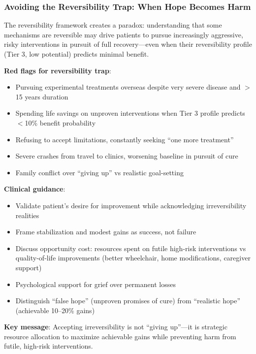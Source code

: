 \subsubsection{Avoiding the Reversibility Trap: When Hope Becomes Harm}

\begin{warning}
The reversibility framework creates a paradox: understanding that some mechanisms are reversible may drive patients to pursue increasingly aggressive, risky interventions in pursuit of full recovery---even when their reversibility profile (Tier 3, low potential) predicts minimal benefit.

\textbf{Red flags for reversibility trap}:
\begin{itemize}
    \item Pursuing experimental treatments overseas despite very severe disease and $>$15 years duration
    \item Spending life savings on unproven interventions when Tier 3 profile predicts $<$10\% benefit probability
    \item Refusing to accept limitations, constantly seeking ``one more treatment''
    \item Severe crashes from travel to clinics, worsening baseline in pursuit of cure
    \item Family conflict over ``giving up'' vs realistic goal-setting
\end{itemize}

\textbf{Clinical guidance}:
\begin{itemize}
    \item Validate patient's desire for improvement while acknowledging irreversibility realities
    \item Frame stabilization and modest gains as success, not failure
    \item Discuss opportunity cost: resources spent on futile high-risk interventions vs quality-of-life improvements (better wheelchair, home modifications, caregiver support)
    \item Psychological support for grief over permanent losses
    \item Distinguish ``false hope'' (unproven promises of cure) from ``realistic hope'' (achievable 10--20\% gains)
\end{itemize}

\textbf{Key message}: Accepting irreversibility is not ``giving up''---it is strategic resource allocation to maximize achievable gains while preventing harm from futile, high-risk interventions.
\end{warning}

